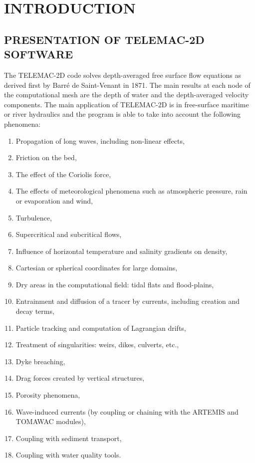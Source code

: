 \chapter{INTRODUCTION}


\section{ PRESENTATION OF TELEMAC-2D SOFTWARE}

 The TELEMAC-2D code solves depth-averaged free surface flow equations as derived first by Barr\'{e} de Saint-Venant in 1871. The main results at each node of the computational mesh are the depth of water and the depth-averaged velocity components. The main application of TELEMAC-2D is in free-surface maritime or river hydraulics and the program is able to take into account the following phenomena:

\begin{enumerate}
\item  Propagation of long waves, including non-linear effects,
\item  Friction on the bed,
\item  The effect of the Coriolis force,
\item  The effects of meteorological phenomena such as atmospheric pressure, rain or evaporation and wind,
\item  Turbulence,
\item  Supercritical and subcritical flows,
\item  Influence of horizontal temperature and salinity gradients on density,
\item  Cartesian or spherical coordinates for large domains,
\item  Dry areas in the computational field: tidal flats and flood-plains,
\item  Entrainment and diffusion of a tracer by currents, including creation and decay terms,
\item  Particle tracking and computation of Lagrangian drifts,
\item  Treatment of singularities: weirs, dikes, culverts, etc.,
\item  Dyke breaching,
\item  Drag forces created by vertical structures,
\item  Porosity phenomena,
\item  Wave-induced currents (by coupling or chaining with the ARTEMIS and TOMAWAC modules),
\item  Coupling with sediment transport,
\item  Coupling with water quality tools.
\end{enumerate}

